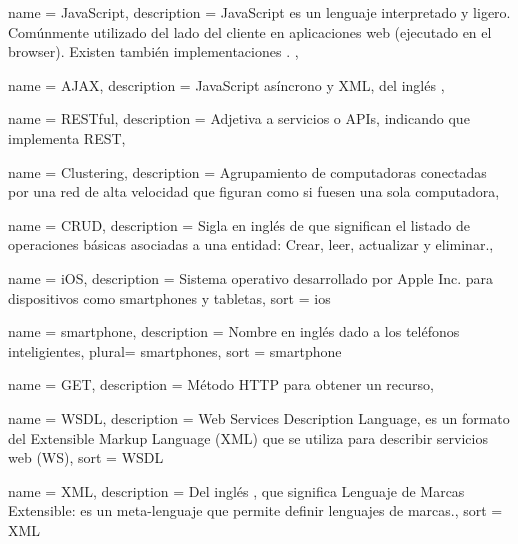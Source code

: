 \newpage

 {
  name = {JavaScript},
  description = {JavaScript es un lenguaje interpretado y ligero. Comúnmente utilizado del lado del cliente en aplicaciones web (ejecutado en el browser). Existen también implementaciones . },
}


 {
  name = {AJAX},
  description = {JavaScript asíncrono y XML, del inglés  },
}

 {
  name = {RESTful},
  description = {Adjetiva a servicios o APIs, indicando que implementa REST},
}

 {
  name = {Clustering},
  description = {Agrupamiento de computadoras conectadas por una red de alta velocidad que figuran como si fuesen una sola computadora},
}

 {
  name = {CRUD},
  description = {Sigla en inglés de  que significan el listado de operaciones básicas asociadas a una entidad: Crear, leer, actualizar y eliminar.},
}

 {
  name = {iOS},
  description = {Sistema operativo desarrollado por Apple Inc. para dispositivos
  como smartphones y tabletas}, sort = {ios}
}

 {
  name = {smartphone},
  description = {Nombre en inglés dado a los teléfonos inteligientes},
  plural= {smartphones},
  sort = {smartphone}
}

 {
  name = {GET},
  description = {Método HTTP para obtener un recurso},
}

 {
  name = {WSDL},
  description = {Web Services Description Language, es un formato del Extensible Markup Language (XML) que se utiliza para describir servicios web (WS)},
  sort = {WSDL}
}

 {
  name = {XML},
  description = {Del inglés , que significa Lenguaje de Marcas Extensible: es un meta-lenguaje que permite definir lenguajes de marcas.},
  sort = {XML}
}




